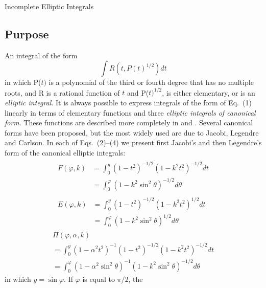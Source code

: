 \documentclass[twoside]{MATH77}
\begin{document}
 Incomplete Elliptic Integrals


\subsection{Purpose}

An integral of the form
\begin{equation}
\label{O1}\int R\left( t,P(t)^{1/2}\right) dt
\end{equation}
in which P($t)$ is a polynomial of the third or fourth degree that has no
multiple roots, and R is a rational function of $t$ and P($t)^{1/2}$, is
either elementary, or is an {\em elliptic integral}. It is always possible to
express integrals of the form of Eq.~(1) linearly in terms of elementary
functions and three {\em elliptic integrals of canonical form}. These functions
are described more completely in \cite{ams55:Ellip-Int} and \cite{Byrd:1971:HEI}.
Several canonical forms have been proposed, but the most widely used are
due to Jacobi, Legendre and Carlson. In each of Eqs.~(2)--(4) we present
first Jacobi's and then Legendre's form of the canonical elliptic integrals:
\begin{gather}
\label{O2}
\begin{split}
F(\varphi ,k)&=\int_0^y\left( 1-t^2\right) ^{-1/2}\left(
1-k^2t^2\right) ^{-1/2}dt\\
&=\int_0^\varphi \left( 1-k^2\sin ^2\theta \right) ^{-1/2}d\theta
\end{split}\\
\label{O3}
\begin{split}
E(\varphi ,k)&=\int_0^y\left( 1-t^2\right) ^{-1/2}\left(
1-k^2t^2\right) ^{1/2}dt\\
&=\int_0^\varphi \left( 1-k^2\sin ^2\theta \right) ^{1/2}d\theta
\end{split}
\end{gather}
\begin{multline}
\label{O4}
\Pi (\varphi ,\alpha ,k)\\
=\int_0^y\left( 1-\alpha ^2t^2\right) ^{-1}\left( 1-t^2\right)
^{-1/2}\left( 1-k^2t^2\right) ^{-1/2}dt\\
=\int_0^\varphi \left( 1-\alpha ^2\sin ^2\theta \right)
^{-1}\left( 1-k^2\sin ^2\theta \right) ^{-1/2}d\theta
\end{multline}
in which $y=\sin \varphi $. If $\varphi $ is equal to $\pi /2$, the
\end{document}
